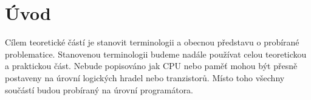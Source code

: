 \chapter*{Úvod}

Cílem teoretické částí je stanovit terminologii a obecnou představu o probírané problematice.
Stanovenou terminologii budeme nadále používat celou teoretickou a praktickou část. Nebude
popisováno jak CPU nebo paměť mohou být přesně postaveny na úrovní logických hradel nebo
tranzistorů. Místo toho všechny součástí budou probíraný na úrovní programátora.
